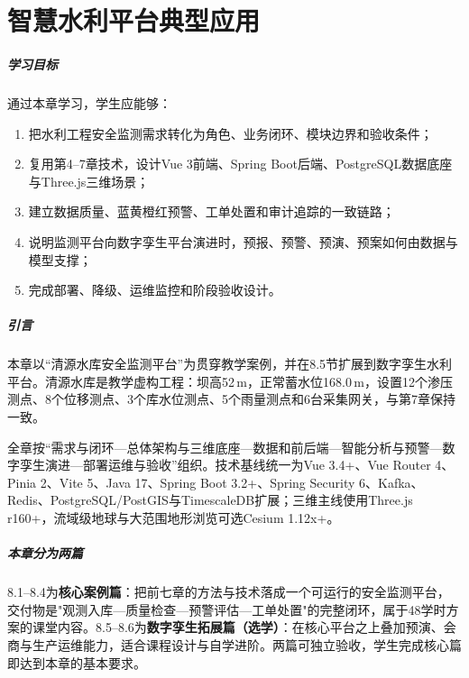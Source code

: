 \chapter{智慧水利平台典型应用}

\paragraph*{学习目标}

通过本章学习，学生应能够：

\begin{enumerate}
\item 把水利工程安全监测需求转化为角色、业务闭环、模块边界和验收条件；
\item 复用第4--7章技术，设计Vue 3前端、Spring Boot后端、PostgreSQL数据底座与Three.js三维场景；
\item 建立数据质量、蓝黄橙红预警、工单处置和审计追踪的一致链路；
\item 说明监测平台向数字孪生平台演进时，预报、预警、预演、预案如何由数据与模型支撑；
\item 完成部署、降级、运维监控和阶段验收设计。
\end{enumerate}

\paragraph*{引言}

本章以“清源水库安全监测平台”为贯穿教学案例，并在8.5节扩展到数字孪生水利平台。清源水库是教学虚构工程：坝高52\,m，正常蓄水位168.0\,m，设置12个渗压测点、8个位移测点、3个库水位测点、5个雨量测点和6台采集网关，与第7章保持一致。

全章按“需求与闭环—总体架构与三维底座—数据和前后端—智能分析与预警—数字孪生演进—部署运维与验收”组织。技术基线统一为Vue 3.4+、Vue Router 4、Pinia 2、Vite 5、Java 17、Spring Boot 3.2+、Spring Security 6、Kafka、Redis、PostgreSQL/PostGIS与TimescaleDB扩展；三维主线使用Three.js r160+，流域级地球与大范围地形浏览可选Cesium 1.12x+。

\begin{notebox}
\paragraph{本章分为两篇}8.1--8.4为\textbf{核心案例篇}：把前七章的方法与技术落成一个可运行的安全监测平台，交付物是"观测入库—质量检查—预警评估—工单处置"的完整闭环，属于48学时方案的课堂内容。8.5--8.6为\textbf{数字孪生拓展篇（选学）}：在核心平台之上叠加预演、会商与生产运维能力，适合课程设计与自学进阶。两篇可独立验收，学生完成核心篇即达到本章的基本要求。
\end{notebox}

